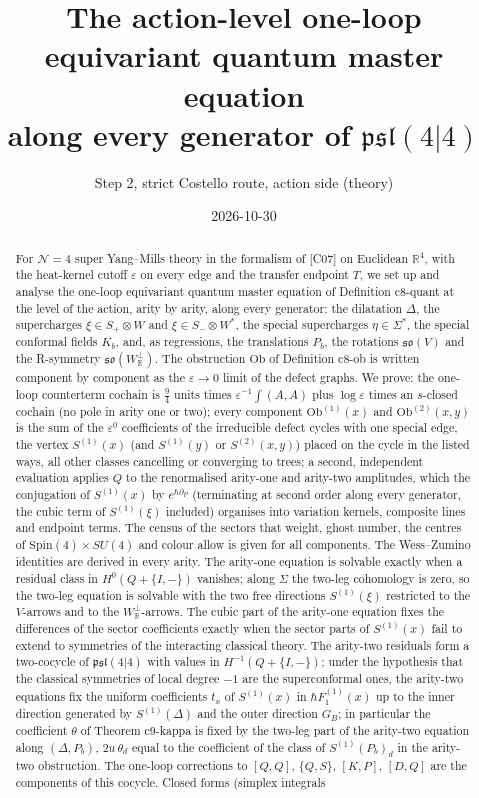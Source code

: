 \documentclass[11pt]{article}
\title{The action-level one-loop equivariant quantum master equation\\ along every generator of $\mathfrak{psl}(4|4)$}
\author{Step 2, strict Costello route, action side (theory)}
\date{2026-10-30}
\numberwithin{equation}{section}
\theoremstyle{plain}
\theoremstyle{definition}
\newcommand{\Ob}{\mathrm{Ob}}
\begin{document}
\maketitle

\begin{abstract}
For $\mathcal N=4$ super Yang--Mills theory in the formalism of [C07] on Euclidean $\mathbb R^4$, with the heat-kernel cutoff $\varepsilon$ on every edge and the transfer endpoint $T$, we set up and analyse the one-loop equivariant quantum master equation of Definition c8-quant at the level of the action, arity by arity, along every generator: the dilatation $\Delta$, the supercharges $\xi\in S_+\otimes W$ and $\xi\in S_-\otimes W^*$, the special supercharges $\eta\in\Sigma^*$, the special conformal fields $K_b$, and, as regressions, the translations $P_b$, the rotations $\mathfrak{so}(V)$ and the R-symmetry $\mathfrak{so}(W^\perp_{\mathbb R})$. The obstruction $\Ob$ of Definition c8-ob is written component by component as the $\varepsilon\to0$ limit of the defect graphs. We prove: the one-loop counterterm cochain is $\tfrac94$ units times $\varepsilon^{-1}\int(A,A)$ plus $\log\varepsilon$ times an $s$-closed cochain (no pole in arity one or two); every component $\Ob^{(1)}(x)$ and $\Ob^{(2)}(x,y)$ is the sum of the $\varepsilon^0$ coefficients of the irreducible defect cycles with one special edge, the vertex $S^{(1)}(x)$ (and $S^{(1)}(y)$ or $S^{(2)}(x,y)$) placed on the cycle in the listed ways, all other classes cancelling or converging to trees; a second, independent evaluation applies $Q$ to the renormalised arity-one and arity-two amplitudes, which the conjugation of $S^{(1)}(x)$ by $e^{\hbar\partial_P}$ (terminating at second order along every generator, the cubic term of $S^{(1)}(\xi)$ included) organises into variation kernels, composite lines and endpoint terms. The census of the sectors that weight, ghost number, the centres of $\mathrm{Spin}(4)\times SU(4)$ and colour allow is given for all components. The Wess--Zumino identities are derived in every arity. The arity-one equation is solvable exactly when a residual class in $H^0(Q+\{I,-\})$ vanishes; along $\Sigma$ the two-leg cohomology is zero, so the two-leg equation is solvable with the two free directions $S^{(1)}(\xi)$ restricted to the $V$-arrows and to the $W^\perp_{\mathbb R}$-arrows. The cubic part of the arity-one equation fixes the differences of the sector coefficients exactly when the sector parts of $S^{(1)}(x)$ fail to extend to symmetries of the interacting classical theory. The arity-two residuals form a two-cocycle of $\mathfrak{psl}(4|4)$ with values in $H^{-1}(Q+\{I,-\})$; under the hypothesis that the classical symmetries of local degree $-1$ are the superconformal ones, the arity-two equations fix the uniform coefficients $t_x$ of $S^{(1)}(x)$ in $\hbar F_1^{(1)}(x)$ up to the inner direction generated by $S^{(1)}(\Delta)$ and the outer direction $G_B$; in particular the coefficient $\theta$ of Theorem c9-kappa is fixed by the two-leg part of the arity-two equation along $(\Delta,P_b)$, $2u\,\theta_d$ equal to the coefficient of the class of $S^{(1)}(P_b)_d$ in the arity-two obstruction. The one-loop corrections to $[Q,Q]$, $\{Q,S\}$, $[K,P]$, $[D,Q]$ are the components of this cocycle. Closed forms (simplex integrals 
\end{abstract}
\end{document}

